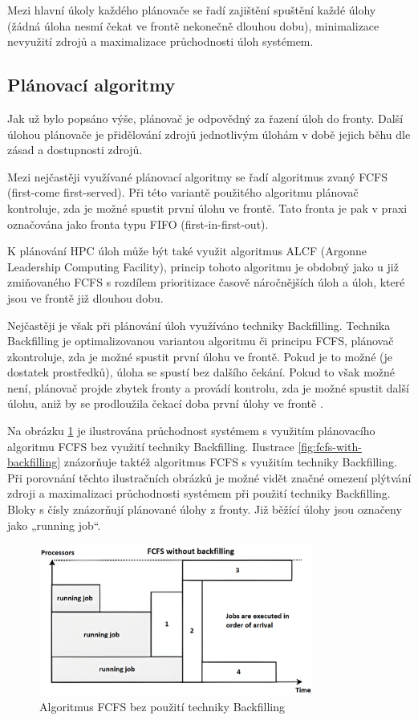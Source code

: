 Mezi hlavní úkoly každého plánovače se řadí zajištění spuštění každé úlohy (žádná úloha nesmí čekat ve frontě nekonečně dlouhou dobu), minimalizace nevyužití zdrojů a maximalizace průchodnosti úloh systémem.


\subsection{Plánovací algoritmy}
Jak už bylo popsáno výše, plánovač je odpovědný za řazení úloh do fronty. Další úlohou plánovače je přidělování zdrojů jednotlivým úlohám v době jejich běhu dle zásad a dostupnosti zdrojů. 

Mezi nejčastěji využívané plánovací algoritmy se řadí algoritmus zvaný FCFS (first-come first-served). Při této variantě použitého algoritmu plánovač kontroluje, zda je možné spustit první úlohu ve frontě. Tato fronta je pak v praxi označována jako fronta typu FIFO (first-in-first-out). 

K plánování HPC úloh může být také využit algoritmus ALCF (Argonne Leadership Computing Facility), princip tohoto algoritmu je obdobný jako u již zmiňovaného FCFS s rozdílem prioritizace časově náročnějších úloh a úloh, které jsou ve frontě již dlouhou dobu. 

Nejčastěji je však při plánování úloh využíváno techniky Backfilling. Technika Backfilling je optimalizovanou variantou algoritmu či principu FCFS, plánovač zkontroluje, zda je možné spustit první úlohu ve frontě. Pokud je to možné (je dostatek prostředků), úloha se spustí bez dalšího čekání. Pokud to však možné není, plánovač projde zbytek fronty a provádí kontrolu, zda je možné spustit další úlohu, aniž by se prodloužila čekací doba první úlohy ve frontě \cite{pr00bfp79qnvRTQ3}.

Na obrázku \ref{fig:fcfs-without-backfilling} je ilustrována průchodnost systémem s využitím plánovacího algoritmu FCFS bez využití techniky Backfilling. Ilustrace \ref{fig:fcfs-with-backfilling} znázorňuje taktéž algoritmus FCFS s využitím techniky Backfilling. Při porovnání těchto ilustračních obrázků je možné vidět značné omezení plýtvání zdroji a maximalizaci průchodnosti systémem při použití techniky Backfilling. Bloky s čísly znázorňují plánované úlohy z fronty. Již běžící úlohy jsou označeny jako „running job“.
\newpage
\begin{figure}
	\centering
	\includegraphics[width=0.8\textwidth]{Figures/fcfs-wb.png}
	\caption{Algoritmus FCFS bez použití techniky Backfilling \cite{GomezMartin2016}}
	\label{fig:fcfs-without-backfilling}
\end{figure}

